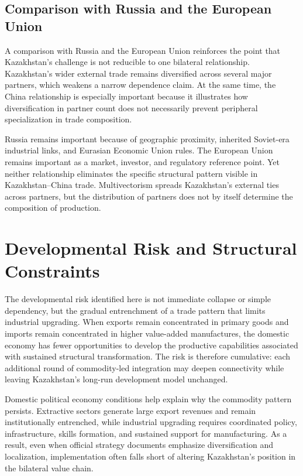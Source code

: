 \documentclass[12pt]{article}
\begin{document}
\subsection{Comparison with Russia and the European Union}

A comparison with Russia and the European Union reinforces the point that Kazakhstan's challenge is not reducible to one bilateral relationship. Kazakhstan's wider external trade remains diversified across several major partners, which weakens a narrow dependence claim. At the same time, the China relationship is especially important because it illustrates how diversification in partner count does not necessarily prevent peripheral specialization in trade composition.

Russia remains important because of geographic proximity, inherited Soviet-era industrial links, and Eurasian Economic Union rules. The European Union remains important as a market, investor, and regulatory reference point. Yet neither relationship eliminates the specific structural pattern visible in Kazakhstan--China trade. Multivectorism spreads Kazakhstan's external ties across partners, but the distribution of partners does not by itself determine the composition of production.

\section{Developmental Risk and Structural Constraints}

The developmental risk identified here is not immediate collapse or simple dependency, but the gradual entrenchment of a trade pattern that limits industrial upgrading. When exports remain concentrated in primary goods and imports remain concentrated in higher value-added manufactures, the domestic economy has fewer opportunities to develop the productive capabilities associated with sustained structural transformation. The risk is therefore cumulative: each additional round of commodity-led integration may deepen connectivity while leaving Kazakhstan's long-run development model unchanged.

Domestic political economy conditions help explain why the commodity pattern persists. Extractive sectors generate large export revenues and remain institutionally entrenched, while industrial upgrading requires coordinated policy, infrastructure, skills formation, and sustained support for manufacturing. As a result, even when official strategy documents emphasize diversification and localization, implementation often falls short of altering Kazakhstan's position in the bilateral value chain.
\end{document}

